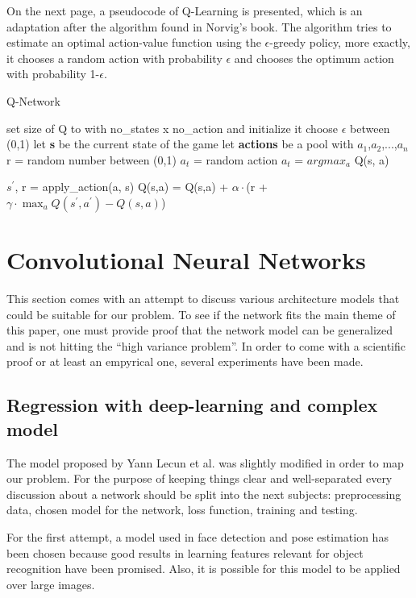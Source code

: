 On the next page, a pseudocode of Q-Learning is presented, which is an adaptation after the algorithm found in Norvig's book{\cite{norvig}}. The algorithm tries to estimate an optimal action-value function using the $\epsilon$-greedy policy, more exactly, it chooses a random action with probability $\epsilon$ and chooses the optimum action with probability 1-$\epsilon$.
\newpage
\begin{algorithm}
	\caption{Q-Network} \label{alg-code}
	\begin{algorithmic}[1]
		\State set size of Q to with no_states x no_action and initialize it
		\State choose $\epsilon$ between (0,1)
		\State let \textbf{s} be the current state of the game
		\State let \textbf{actions} be a pool with {$a_1$,$a_2$,...,$a_n$}
			\State r = random number between (0,1)
				\State $a_t$ = random action
			\Else
				\State $a_t$ = $argmax_a$ Q(s, a)
			\EndIf
			
			\State $s^\prime$, r = apply_action(a, s)
			\State Q(s,a) = Q(s,a) + $\alpha\cdot$(r + $\gamma\cdot \max_a Q(s^\prime,a^\prime)-Q(s,a)$)
		\EndWhile
	\end{algorithmic}
\end{algorithm}

\section{Convolutional Neural Networks}
This section comes with an attempt to discuss various architecture models that could be suitable for our problem. To see if the network fits the main theme of this paper, one must provide proof that the network model can be generalized and is not hitting the ``high variance problem''. In order to come with a scientific proof or at least an empyrical one, several experiments have been made.

\subsection{Regression with deep-learning and complex model}
The model proposed by Yann Lecun et al.\cite{energy-based} was slightly modified in order to map our problem. For the purpose of keeping things clear and well-separated every discussion about a network should be split into the next subjects: preprocessing data, chosen model for the network, loss function, training and testing.

For the first attempt, a model used in face detection and pose estimation has been chosen because good results in learning features relevant for object recognition have been promised. Also, it is possible for this model to be applied over large images.

